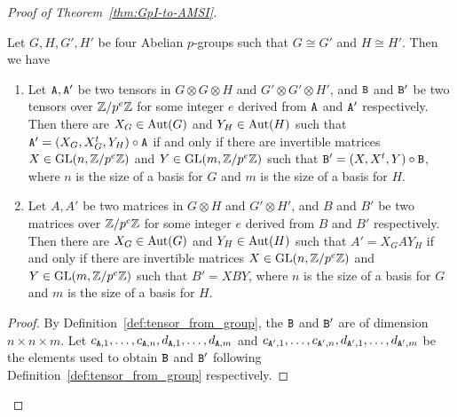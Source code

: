 \begin{proof}[Proof of Theorem~\ref{thm:GpI-to-AMSI}]
\begin{lemma}\label{lem:reduction_to_homocyclic}
Let $G, H, G', H'$ be four Abelian $p$-groups such that $G \cong G'$ and $H \cong H'$. Then we have 
\begin{enumerate}
\item Let $\mathtt{A}, \mathtt{A}'$ be two tensors in $G \otimes G  \otimes H$ and $G' \otimes G' \otimes H'$, and 
$\mathtt{B}$ and $\mathtt{B}'$ be two tensors over $\mathbb{Z} / p^e \mathbb{Z}$ for some integer $e$ derived from $\mathtt{A}$ and $\mathtt{A}'$ respectively. 
Then there are $X_G \in \mathrm{Aut}(G)$ and $Y_H \in \mathrm{Aut}(H)$ such that 
$\mathtt{A}' = (X_G, X_G^t, Y_H) \circ \mathtt{A}$ 
if and only if there are invertible matrices $X \in \mathrm{GL}(n, \mathbb{Z} / p^e \mathbb{Z})$ and $Y \in \mathrm{GL}(m, \mathbb{Z} / p^e \mathbb{Z})$ such that $\mathtt{B}' = (X, X^t, Y) \circ \mathtt{B}$, where $n$ is the size of a basis for $G$ and $m$ is the size of a basis for $H$. 
\item Let $A, A'$ be two matrices in $G  \otimes H$ and $G' \otimes H'$, and 
$B$ and $B'$ be two matrices over $\mathbb{Z} / p^e \mathbb{Z}$ for some integer $e$ derived from $B$ and $B'$ respectively. 
Then there are $X_G \in \mathrm{Aut}(G)$ and $Y_H \in \mathrm{Aut}(H)$ such that 
$A' = X_G A Y_H$ %
if and only if there are invertible matrices $X \in \mathrm{GL}(n, \mathbb{Z} / p^e \mathbb{Z})$ and $Y \in \mathrm{GL}(m, \mathbb{Z} / p^e \mathbb{Z})$ such that $B'= X  B Y$, where $n$ is the size of a basis for $G$ and $m$ is the size of a basis for $H$. 

\end{enumerate}
\end{lemma}
\begin{proof}
By Definition~\ref{def:tensor_from_group}, the $\mathtt{B}$ and $\mathtt{B}'$ are of dimension $n \times n \times m$. 
Let $c_{\mathtt{A}, 1}, \dots, c_{\mathtt{A}, n}, d_{\mathtt{A}, 1}, \dots, d_{\mathtt{A}, m}$ and $c_{\mathtt{A}', 1}, \dots, c_{\mathtt{A}', n}, d_{\mathtt{A}', 1}, \dots, d_{\mathtt{A}', m}$ be the elements used to obtain $\mathtt{B}$ and $\mathtt{B}'$  following Definition~\ref{def:tensor_from_group} respectively. 


\end{proof}
\end{proof}
